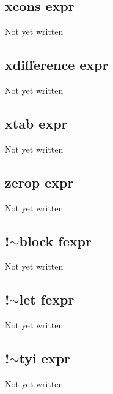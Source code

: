 \documentclass[a4paper,11pt]{article}
\begin{document}
\subsection{\ttfamily xcons expr}
Not yet written

\subsection{\ttfamily xdifference expr}
Not yet written

\subsection{\ttfamily xtab expr}
Not yet written

\subsection{\ttfamily zerop expr}
Not yet written

\subsection{\ttfamily !$\sim$block fexpr}
Not yet written

\subsection{\ttfamily !$\sim$let fexpr}
Not yet written

\subsection{\ttfamily !$\sim$tyi expr}
Not yet written
\end{document}

